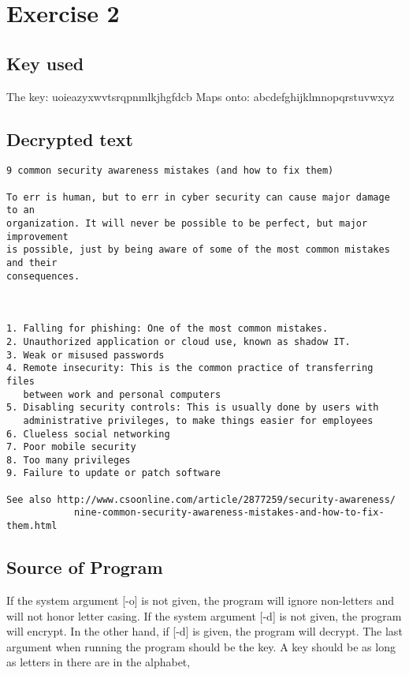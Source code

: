 \documentclass[a4paper]{article}
\begin{document}
\section{Exercise 2}

\subsection{Key used}
The key:
uoieazyxwvtsrqpnmlkjhgfdcb\newline
Maps onto: \newline
abcdefghijklmnopqrstuvwxyz\newline

\subsection{Decrypted text}

\begin{verbatim}
9 common security awareness mistakes (and how to fix them)

To err is human, but to err in cyber security can cause major damage to an
organization. It will never be possible to be perfect, but major improvement
is possible, just by being aware of some of the most common mistakes and their
consequences.



1. Falling for phishing: One of the most common mistakes.
2. Unauthorized application or cloud use, known as shadow IT.
3. Weak or misused passwords
4. Remote insecurity: This is the common practice of transferring files
   between work and personal computers
5. Disabling security controls: This is usually done by users with
   administrative privileges, to make things easier for employees
6. Clueless social networking
7. Poor mobile security
8. Too many privileges
9. Failure to update or patch software

See also http://www.csoonline.com/article/2877259/security-awareness/
            nine-common-security-awareness-mistakes-and-how-to-fix-them.html
\end{verbatim}


\subsection{Source of Program}
If the system argument [-o] is not given, the program will ignore non-letters and will not honor letter casing. If the system argument [-d] is not given, the program will encrypt. In the other hand, if [-d] is given, the program will decrypt. The last argument when running the program should be the key. A key should be as long as letters in there are in the alphabet, 
\end{document}
